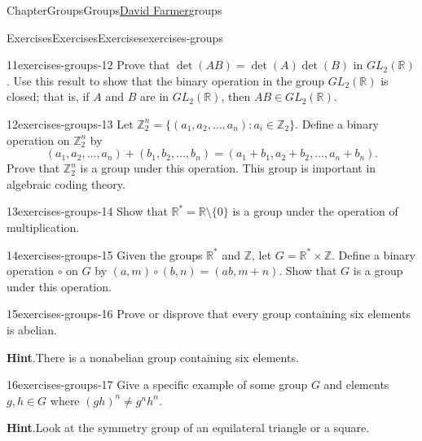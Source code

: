 \documentclass[oneside,10pt,]{book}
\newcommand{\blocktitlefont}{\relax}
\numberwithin{equation}{section}
\begin{document}
\begin{chapterptx}{Chapter}{Groups}{}{Groups}{\hyperlink{dfarmer}{David Farmer}}{}{groups}
\begin{exercises-section}{Exercises}{Exercises}{}{Exercises}{}{}{exercises-groups}
\begin{divisionexercise}{11}{}{}{exercises-groups-12}%
Prove that \(\det(AB) = \det(A) \det(B)\) in \(GL_2({\mathbb R})\). Use this result to show that the binary operation in the group \(GL_2({\mathbb R})\) is closed; that is, if \(A\) and \(B\) are in \(GL_2({\mathbb R})\), then \(AB \in GL_2({\mathbb R})\).%
\end{divisionexercise}%
\begin{divisionexercise}{12}{}{}{exercises-groups-13}%
Let \({\mathbb Z}_2^n = \{ (a_1, a_2, \ldots, a_n) : a_i \in {\mathbb Z}_2 \}\). Define a binary operation on \({\mathbb Z}_2^n\) by%
\begin{equation*}
(a_1, a_2, \ldots, a_n) + (b_1, b_2, \ldots, b_n) = (a_1 + b_1, a_2 + b_2, \ldots, a_n + b_n).
\end{equation*}
Prove that \({\mathbb Z}_2^n\) is a group under this operation. This group is important in algebraic coding theory.%
\end{divisionexercise}%
\begin{divisionexercise}{13}{}{}{exercises-groups-14}%
Show that \({\mathbb R}^{\ast} = {\mathbb R} \setminus \{0 \}\) is a group under the operation of multiplication.%
\end{divisionexercise}%
\begin{divisionexercise}{14}{}{}{exercises-groups-15}%
Given the groups  \({\mathbb R}^{\ast}\) and \({\mathbb Z}\), let \(G = {\mathbb R}^{\ast}  \times {\mathbb Z}\). Define a binary operation \(\circ\) on \(G\) by \((a,m) \circ (b,n) = (ab, m + n)\). Show that \(G\) is a group under this operation.%
\end{divisionexercise}%
\begin{divisionexercise}{15}{}{}{exercises-groups-16}%
Prove or disprove that every group containing six elements is abelian.%
\par\smallskip%
\noindent\textbf{\blocktitlefont Hint}.\hypertarget{exercises-groups-16-2}{}\quad{}There is a nonabelian group containing six elements.%
\end{divisionexercise}%
\begin{divisionexercise}{16}{}{}{exercises-groups-17}%
Give a specific example of some group \(G\) and elements \(g, h \in G\) where \((gh)^n \neq g^nh^n\).%
\par\smallskip%
\noindent\textbf{\blocktitlefont Hint}.\hypertarget{exercises-groups-17-2}{}\quad{}Look at the symmetry group of an equilateral triangle or a square.%
\end{divisionexercise}%

\end{exercises-section}
\end{chapterptx}
\end{document}
